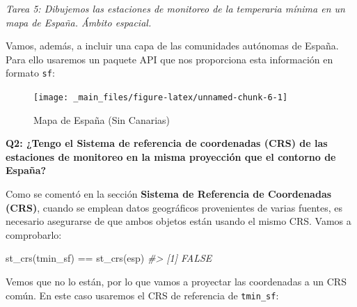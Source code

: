 \documentclass[
]{report}
\newenvironment{Shaded}{\begin{snugshade}}{\end{snugshade}}
\newcommand{\CommentTok}[1]{\textcolor[rgb]{0.56,0.35,0.01}{\textit{#1}}}
\newcommand{\FunctionTok}[1]{\textcolor[rgb]{0.00,0.00,0.00}{#1}}
\newcommand{\NormalTok}[1]{#1}
\newcommand{\OtherTok}[1]{\textcolor[rgb]{0.56,0.35,0.01}{#1}}
\newcommand{\SpecialCharTok}[1]{\textcolor[rgb]{0.00,0.00,0.00}{#1}}
\newcommand{\StringTok}[1]{\textcolor[rgb]{0.31,0.60,0.02}{#1}}
\theoremstyle{definition}
\theoremstyle{definition}
\theoremstyle{definition}
\theoremstyle{definition}
\theoremstyle{remark}
\begin{document}
\emph{Tarea 5: Dibujemos las estaciones de monitoreo de la temperaria mínima en un
mapa de España. Ámbito espacial.}

Vamos, además, a incluir una capa de las comunidades autónomas de España. Para
ello usaremos un paquete API que nos proporciona esta información en formato
\texttt{sf}:

\begin{Shaded}
\end{Shaded}

\begin{figure}

{\centering \texttt{[image: \_main\_files/figure-latex/unnamed-chunk-6-1]} 

}

\caption{Mapa de España (Sin Canarias)}\label{fig:unnamed-chunk-6}
\end{figure}

\textbf{Q2: ¿Tengo el Sistema de referencia de coordenadas (CRS) de las estaciones de
monitoreo en la misma proyección que el contorno de España?}

Como se comentó en la sección \textbf{Sistema de Referencia de Coordenadas (CRS)},
cuando se emplean datos geográficos provenientes de varias fuentes, es necesario
asegurarse de que ambos objetos están usando el mismo CRS. Vamos a comprobarlo:

\begin{Shaded}
\begin{Highlighting}[]
\FunctionTok{st\_crs}\NormalTok{(tmin\_sf) }\SpecialCharTok{==} \FunctionTok{st\_crs}\NormalTok{(esp)}
\CommentTok{\#\textgreater{} [1] FALSE}
\end{Highlighting}
\end{Shaded}

Vemos que no lo están, por lo que vamos a proyectar las coordenadas a un CRS
común. En este caso usaremos el CRS de referencia de \texttt{tmin\_sf}:
\end{document}
